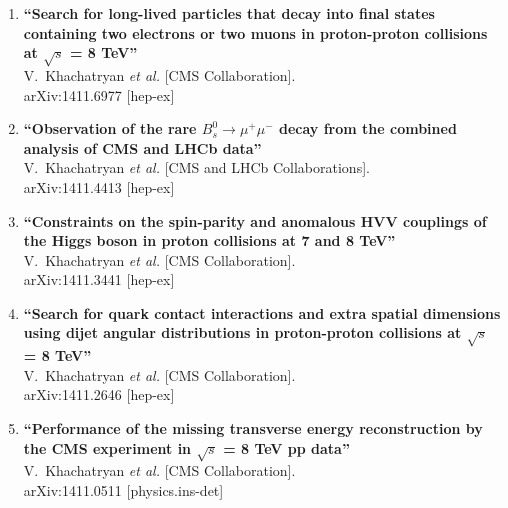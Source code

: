 \documentclass{article}
\begin{document}
\begin{enumerate}



\item%
{\bf ``Search for long-lived particles that decay into final states containing two electrons or two muons in proton-proton collisions at $\sqrt{s}$ = 8 TeV''}
  \\{}V.~Khachatryan {\it et al.}  [CMS Collaboration].
  \\{}arXiv:1411.6977 [hep-ex]
  


\item%
{\bf ``Observation of the rare $B^0_s\to\mu^+\mu^-$ decay from the combined analysis of CMS and LHCb data''}
  \\{}V.~Khachatryan {\it et al.}  [CMS and LHCb Collaborations].
  \\{}arXiv:1411.4413 [hep-ex]
  


\item%
{\bf ``Constraints on the spin-parity and anomalous HVV couplings of the Higgs boson in proton collisions at 7 and 8 TeV''}
  \\{}V.~Khachatryan {\it et al.}  [CMS Collaboration].
  \\{}arXiv:1411.3441 [hep-ex]
  


\item%
{\bf ``Search for quark contact interactions and extra spatial dimensions using dijet angular distributions in proton-proton collisions at $\sqrt{s}$ = 8 TeV''}
  \\{}V.~Khachatryan {\it et al.}  [CMS Collaboration].
  \\{}arXiv:1411.2646 [hep-ex]
  


\item%
{\bf ``Performance of the missing transverse energy reconstruction by the CMS experiment in $\sqrt{s}$ = 8 TeV pp data''}
  \\{}V.~Khachatryan {\it et al.}  [CMS Collaboration].
  \\{}arXiv:1411.0511 [physics.ins-det]
  

\end{enumerate}
\end{document}

